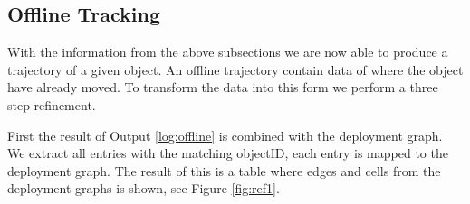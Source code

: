 \subsection{Offline Tracking}
\label{sub:offline}
With the information from the above subsections we are now able to produce a trajectory of a given object.
An offline trajectory contain data of where the object have already moved.
To transform the data into this form we perform a three step refinement.

First the result of Output \ref{log:offline} is combined with the deployment graph.
We extract all entries with the matching objectID, each entry is mapped to the deployment graph.
The result of this is a table where edges and cells from the deployment graphs is shown, see Figure \ref{fig:ref1}.  
\begin{comment}
Next we revert the data such that we have the time intervals where object are not in sensor range.
In Figure \ref{fig:ref2} the three sensor reading are converted into two intervals where we know which cell the object is located in.

Last we further limit the area of which the object is located in. 
We use the knowledge obtained in Section \ref{sec:speed} to limit the area based on two sensor points and the max speed of the object.
The result of the refinement can be seen in Figure \ref{fig:ref3}.
 


\begin{figure}
\begin{minipage}[c][][]{\columnwidth}
  \vspace*{\fill}
  \centering
		\begin{tabular}{| l  l  l | }
		\toprule
		\textbf{Interval} & \textbf{Location}\\ 
		\midrule
		[$t_1,t_2$] & c9 \\ 

		[$t_6,t_10$] &  $e\langle9,3\rangle$\\ 

		[$t_21,t_30$] &  $e\langle3,9\rangle$\\ 
		\bottomrule
		\end{tabular}
  \caption{test figure two}
  \label{fig:test2}\par\vfill
		\begin{tabular}{ | l  l  l | }
		\toprule
		\textbf{Interval} & \textbf{Location}\\ 
		\midrule
		[$t_3,t_5$] & c9 \\ 


\end{comment}
